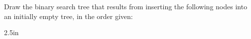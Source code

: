 \begin{prob}

    Draw the binary search tree that results from inserting the following
    nodes into an initially empty tree, in the order given:

    \begin{responsebox}{2.5in}

    \end{responsebox}

\end{prob}
